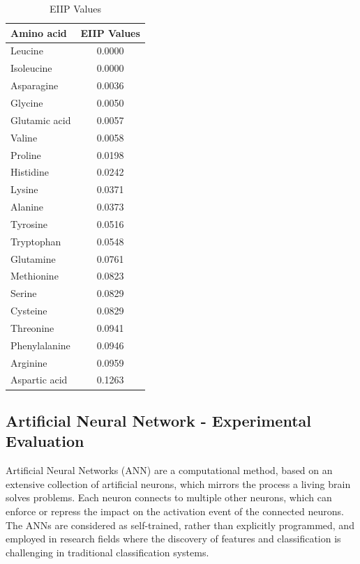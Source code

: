 \documentclass[letterpaper, 10 pt, conference]{ieeeconf}  %
\begin{document}
\begin{table}[ht]
\caption{EIIP Values}
\setlength{\tabcolsep}{6pt}
\centering 
\begin{tabular}{l c} 
\hline 
Amino acid & EIIP Values \\
\hline
Leucine & 0.0000\\
Isoleucine & 0.0000\\ 
Asparagine & 0.0036\\ 
Glycine & 0.0050\\ 
Glutamic acid & 0.0057\\ 
Valine & 0.0058\\ 
Proline & 0.0198\\ 
Histidine & 0.0242\\ 
Lysine & 0.0371\\ 
Alanine & 0.0373\\ 
Tyrosine & 0.0516\\
Tryptophan & 0.0548\\
Glutamine & 0.0761\\
Methionine & 0.0823\\
Serine & 0.0829\\
Cysteine & 0.0829\\
Threonine & 0.0941\\
Phenylalanine & 0.0946\\
Arginine & 0.0959\\
Aspartic acid & 0.1263\\

  \hline 
\end{tabular} 
\label{eiip_values} 
\end{table}  


\subsection{Artificial Neural Network - Experimental Evaluation}


Artificial Neural Networks (ANN) \cite{gupta2013artificial} are a computational method, based on an extensive collection of artificial neurons, which mirrors the process a living brain solves problems. Each neuron connects to multiple other neurons, which can enforce or repress the impact on the activation event of the connected neurons. The ANNs are considered as self-trained, rather than explicitly programmed, and employed in research fields where the discovery of features and classification is challenging in traditional classification systems.   
 
\end{document}
